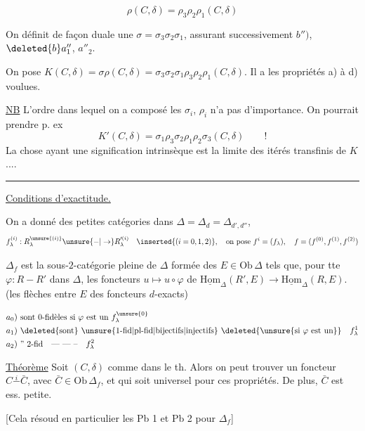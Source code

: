 
\[\rho(C,\delta)=\rho_3\rho_2\rho_1(C,\delta)\]

On définit de façon duale une  $\sigma=\sigma_3\sigma_2\sigma_1$, assurant successivement $b'')$, $\deleted{b}a''_1$, $a''_2$.

On pose $K(C,\delta)=\sigma\rho(C,\delta)=\sigma_3\sigma_2\sigma_1\rho_3\rho_2\rho_1(C,\delta)$. Il a les propriétés a) à d) voulues.

\uline{NB} L'ordre dans lequel on a composé les  $\sigma_i$,  $\rho_i$ n'a pas d'importance. On pourrait prendre p. ex
\[
K'(C,\delta)=\sigma_1\rho_3\sigma_2\rho_1\rho_2\sigma_3(C,\delta)\qquad !
\]
La chose ayant une signification intrinsèque est la limite des  itérés transfinis de $K$....

\begin{center}\rule{1.1cm}{0.4pt}\end{center}

\uline{Conditions d'exactitude.}

On a donné  des petites catégories dans $\Delta=\Delta_d=\Delta_{d',d''}$, 
\[
f^{(i)}_\lambda:R^{\unsure{(i)}}_\lambda\unsure{-|\to}R^{\prime(i)}_\lambda\quad\inserted{(i=0,1,2)},\quad\text{on pose } f^i=(f_\lambda),\quad f=(f^{(0)},f^{(1)},f^{(2)})
\]

$\Delta_f$ est la sous-$2$-catégorie pleine de $\Delta$ formée des $E\in\mathrm{Ob}\,\Delta$ tels que,  pour tte $\varphi:R-R'$ dans $\Delta$, les foncteurs $u\longmapsto u\circ\varphi$ de $\underline{\mathrm{Hom}}_\Delta(R',E)\longrightarrow\underline{\mathrm{Hom}}_\Delta(R,E)$. (les flèches entre $E$  des foncteurs $d$-exacts)

\[
\begin{aligned}
a_0)&\ \text{sont 0-fidèles si }\varphi\text{ est un } f_\lambda^{\unsure{0}}\\
a_1)&\ \deleted{\text{sont}}\ \unsure{\text{1-fid}|\text{pl-fid}|\text{bijectifs}|\text{injectifs}}\ \deleted{\unsure{\text{si }\varphi\text{ est un}}}\quad f_\lambda^1\\
a_2)&\ \text{'' 2-fid}\quad\text{--- --- --}\quad f_\lambda^2
\end{aligned}
\]

\uline{Théorème}  Soit $(C,\delta)$ comme dans le th. Alors on peut trouver un foncteur  $C\overset{i}{-}\bar C$, avec $\bar C\in\mathrm{Ob}\,\Delta_f$, et qui soit universel pour ces propriétés. De plus, $\bar C$ est ess. petite.

[Cela résoud en particulier les Pb 1 et Pb 2  pour $\Delta_f$]

